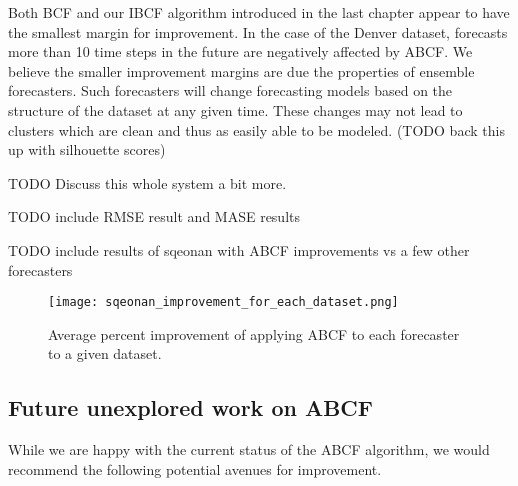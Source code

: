 Both BCF and our IBCF algorithm introduced in the last chapter appear to have the smallest margin for improvement.  In the case of the Denver dataset, forecasts more than 10 time steps in the future are negatively affected by ABCF.  We believe the smaller improvement margins are due the properties of ensemble forecasters.  Such forecasters will change forecasting models based on the structure of the dataset at any given time.  These changes may not lead to clusters which are clean and thus as easily able to be modeled.  (TODO back this up with silhouette scores)

TODO Discuss this whole system a bit more.

TODO include RMSE result and MASE results

TODO include results of sqeonan with ABCF improvements vs a few other forecasters



\begin{figure}
	\begin{center}
		\texttt{[image: sqeonan\_improvement\_for\_each\_dataset.png]}
	\end{center}
	\caption{Average percent improvement of applying ABCF to each forecaster to a given dataset.}
	\label{fig:sqeonan_improvement_all_dataset}
\end{figure}






\subsection{Future unexplored work on ABCF}
While we are happy with the current status of the ABCF algorithm, we would recommend the following potential avenues for improvement.

